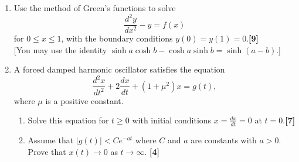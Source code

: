 \documentclass[a4paper]{article}
\begin{document}
\begin{qns}\leavevmode
\begin{enumerate}[label=(\alph*)]
    \item Use the method of Green’s functions to solve
$$\frac{d^2y}{dx^2}-y=f(x)$$
for $0\leq x\leq 1$, with the boundary conditions $y(0) = y(1) = 0$.\hfill \textbf{[9]}\\[5pt]
[You may use the identity $\sinh a \cosh b − \cosh a \sinh b = \sinh(a − b)$.]
\item A forced damped harmonic oscillator satisfies the equation
$$\frac{d^2x}{dt^2}+2\frac{dx}{dt}+(1+\mu^2)x=g(t),$$
where $\mu$ is a positive constant.
\begin{enumerate}[label=(\roman*)]
    \item Solve this equation for $t\geq0$ with initial conditions $x=\frac{dx}{dt}=0$ at $t=0$.\hfill \textbf{[7]}
    \item Assume that $|g(t)|<Ce^{-at}$ where $C$ and $a$ are constants with $a > 0$. Prove that $x(t)\rightarrow0$ as $t\rightarrow\infty$. \hfill \textbf{[4]}
\end{enumerate}
\end{enumerate}
\end{qns}
\end{document}
